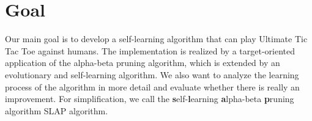 \section{Goal}
Our main goal is to develop a self-learning algorithm that can play Ultimate Tic Tac Toe against humans. The implementation is realized by a target-oriented application of the alpha-beta pruning algorithm, which is extended by an evolutionary and self-learning algorithm. We also want to analyze the learning process of the algorithm in more detail and evaluate whether there is really an improvement. For simplification, we call the \textbf{s}elf-\textbf{l}earning \textbf{a}lpha-beta \textbf{p}runing algorithm SLAP algorithm.
%
%
%


